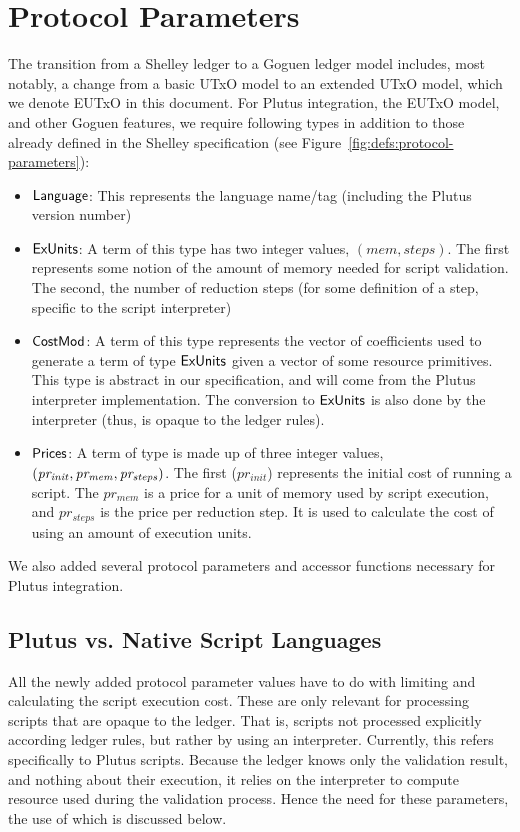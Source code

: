 \section{Protocol Parameters}
\label{sec:protocol-parameters}

The transition from a Shelley ledger to a Goguen ledger model includes, most
notably, a change from a basic UTxO model to an extended UTxO model, which
we denote EUTxO in this document.
For Plutus integration, the EUTxO model, and other Goguen features, we
require following types
in addition to those already defined in the Shelley specification
(see Figure~\ref{fig:defs:protocol-parameters}):

\begin{itemize}
  \item $\mathsf{Language}$: This represents the language name/tag (including the Plutus
  version number)
  \item $\mathsf{ExUnits}$: A term of this type has two integer values, $(mem, steps)$. The first
  represents some notion of the amount of memory needed for script validation.
  The second, the number of reduction steps (for some definition of a step, specific
  to the script interpreter)
  \item $\mathsf{CostMod}$: A term of this type represents the vector of coefficients used to generate
  a term of type $\mathsf{ExUnits}$ given a vector of some resource primitives. This type is
  abstract in our specification, and will come from the Plutus interpreter
  implementation. The
  conversion to $\mathsf{ExUnits}$ is also done by the interpreter (thus, is opaque to the ledger rules).
  \item $\mathsf{Prices}$: A term of type is made up of three integer values,
  $\mathit{(pr_{init}, pr_{mem}, pr_{steps})}$. The first ($pr_{init}$) represents the initial
  cost of running a script. The $pr_{mem}$ is a price for a unit of memory
  used by script execution, and $pr_{steps}$ is the price per
  reduction step. It is used to calculate the cost of using an amount of execution
  units.
\end{itemize}

We also added several protocol parameters and accessor functions necessary for
Plutus integration.

\subsection{Plutus vs. Native Script Languages}
\label{sec:plutus-native}

All the newly added protocol parameter values have to do with limiting and calculating
the script execution cost.
These are only relevant for processing scripts that are opaque
to the ledger. That is, scripts not processed explicitly according ledger rules,
but rather by using an interpreter. Currently, this refers specifically
to Plutus scripts. Because the ledger knows only the validation result, and
nothing about their execution, it relies on the interpreter to compute resource
used during the validation process. Hence the need for these parameters,
the use of which is discussed below.

